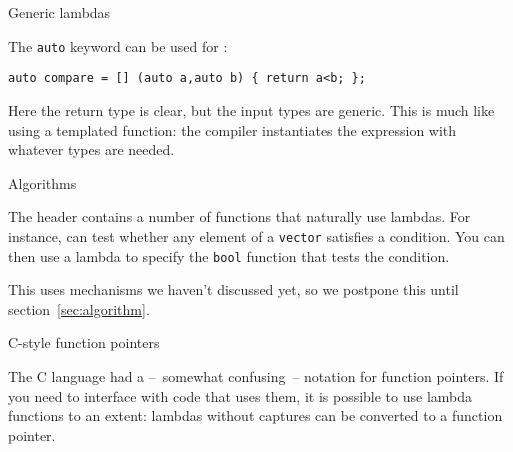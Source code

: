  {Generic lambdas}
\label{sec:lambda-generic}

The \lstinline{auto} keyword can be used for
:
\begin{lstlisting}
auto compare = [] (auto a,auto b) { return a<b; };
\end{lstlisting}
Here the return type is clear, but the input types are generic.
This is much like using a templated function:
the compiler instantiates the expression with whatever types are needed.

 {Algorithms}

The  header 
contains a number of functions that
naturally use lambdas. For instance,  can test
whether any element of a \lstinline{vector} satisfies a condition.
You can then use a lambda to specify the \lstinline{bool} function
that tests the condition.

This uses mechanisms we haven't discussed yet, so we postpone
this until section~\ref{sec:algorithm}.

 {C-style function pointers}

The C language had a --~somewhat confusing~-- notation
for function pointers.
If you need to interface with code that uses them,
it is possible to use lambda functions to an extent:
lambdas without captures can be converted to a function pointer.

